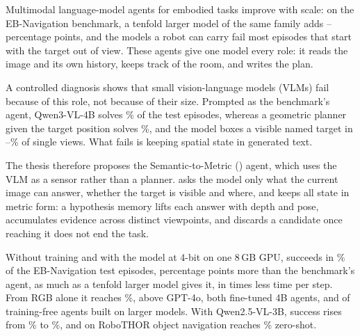 Multimodal language-model agents for embodied tasks improve with scale: on the EB-Navigation benchmark, a tenfold
larger model of the same family adds \nScaleQwen--\nScaleIntern{} percentage points, and the models a robot can carry
fail most episodes that start with the target out of view. These agents give one model every role: it reads the
image and its own history, keeps track of the room, and writes the plan.

A controlled diagnosis shows that small vision-language models (VLMs) fail because of this role, not because of
their size. Prompted as the benchmark's agent, Qwen3-VL-4B solves \nEBThree\% of the test episodes, whereas a
geometric planner given the target position solves \nOracle\%, and the model boxes a visible named target in
\nProbeThreeCommon--\nProbeThreeBase\% of single views. What fails is keeping spatial state in generated text.

The thesis therefore proposes the Semantic-to-Metric (\ours) agent, which uses the VLM as a sensor rather than a
planner. \ours asks the model only what the current image can answer, whether the target is visible and where, and
keeps all state in metric form: a hypothesis memory lifts each answer with depth and pose, accumulates evidence
across distinct viewpoints, and discards a candidate once reaching it does not end the task.

Without training and with the model at 4-bit on one 8\,GB GPU, \ours succeeds in \nSThree\% of the EB-Navigation
test episodes, \nGainThree{} percentage points more than the benchmark's agent, as much as a tenfold larger model gives
it, in \nSpeedUp{} times less time per step. From RGB alone it reaches \nRGBThree\%, above GPT-4o, both fine-tuned 4B
agents, and \nNTrainFreeBelowRGB{} of \nNTrainFree{} training-free agents built on larger models. With Qwen2.5-VL-3B,
success rises from \nEBTwo\% to \nSTwo\%, and on RoboTHOR object navigation \ours reaches \nRoboSR\% zero-shot.
